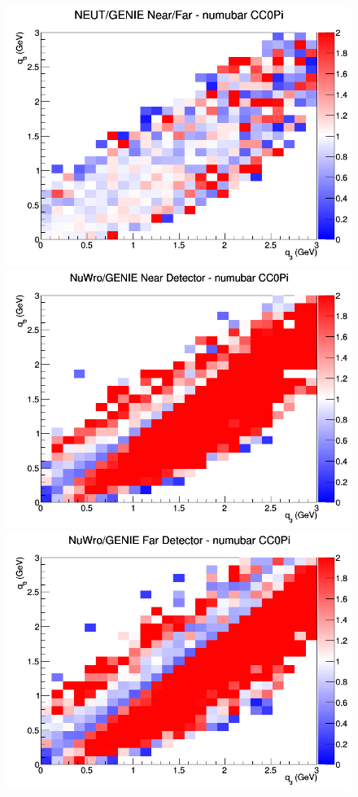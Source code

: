 \documentclass[12pt]{article}
\begin{document}
\begin{figure}[h]
\endminipage
{}
\includegraphics[width=\linewidth]{eff_q0_q3/LAr/ratios/CC0Pi_NEUT_GENIE_numubar_NF_q3_q0.png}
\endminipage
\newline
{}
\includegraphics[width=\linewidth]{eff_q0_q3/LAr/ratios/CC0Pi_NuWro_GENIE_numubar_near_q3_q0.png}
\endminipage
{}
\includegraphics[width=\linewidth]{eff_q0_q3/LAr/ratios/CC0Pi_NuWro_GENIE_numubar_far_q3_q0.png}

\end{figure}
\end{document}
